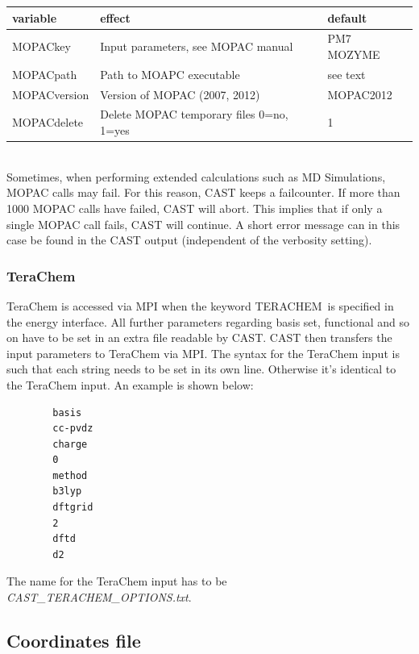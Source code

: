 \documentclass[10pt,a4paper]{article} %
\begin{document}
		\begin{tabularx}{\textwidth}{l|l|l}
			variable & effect & default \\
			\hline
			MOPACkey & Input parameters, see MOPAC manual & PM7 MOZYME\\
			MOPACpath & Path to MOAPC executable & see text\\
			MOPACversion & Version of MOPAC (2007, 2012) & MOPAC2012\\
			MOPACdelete & Delete MOPAC temporary files 0=no, 1=yes & 1\\

		\end{tabularx}~\\
		
		Sometimes, when performing extended calculations such as \ac{MD} Simulations, \ac{MOPAC} calls may fail. For this reason, \ac{CAST} keeps a failcounter. If more than 1000 \ac{MOPAC} calls have failed, \ac{CAST} will abort. This implies that if only a single \ac{MOPAC} call fails, \ac{CAST} will continue. A short error message can in this case be found in the \ac{CAST} output (independent of the verbosity setting).
		
		\subsubsection{TeraChem}
		TeraChem\supercite{terachem} is accessed via \ac{MPI}\supercite{mpi} when the keyword \glqq TERACHEM\grqq~is specified in the energy interface. All further parameters regarding basis set, functional and so on have to be set in an extra file readable by \ac{CAST}. \ac{CAST} then transfers the input parameters to TeraChem via \ac{MPI}. The syntax for the TeraChem input is such that each string needs to be set in its own line. Otherwise it's identical to the TeraChem input. An example is shown below:

		\begin{lstlisting}
		basis
		cc-pvdz
		charge
		0
		method
		b3lyp
		dftgrid
		2
		dftd
		d2\end{lstlisting}

		The name for the TeraChem input has to be \glqq \textit{CAST\_TERACHEM\_OPTIONS.txt}\grqq.
			
			
	\subsection{Coordinates file}
	
\end{document}
